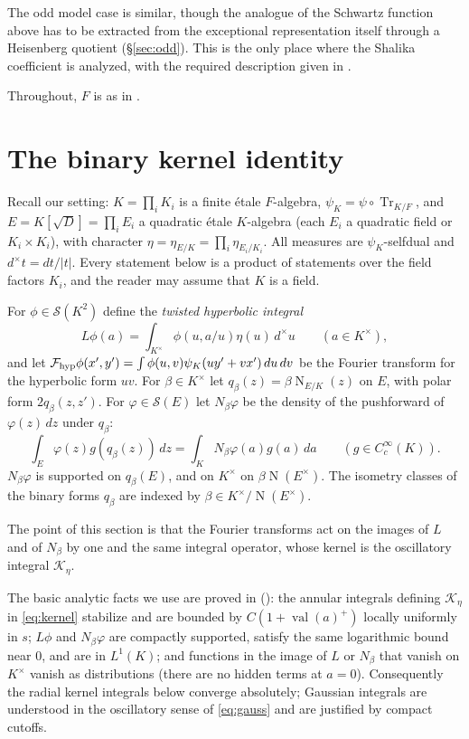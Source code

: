 \documentclass[11pt,oneside,notitlepage]{book}
\numberwithin{equation}{section}
\theoremstyle{plain}
\theoremstyle{definition}
\newcommand{\cS}{\mathcal{S}}
\newcommand{\Tr}{\operatorname{Tr}}
\newcommand{\N}{\operatorname{N}}
\newcommand{\val}{\operatorname{val}}
\begin{document}
 The odd model case is similar, though the analogue of the Schwartz function above has to be extracted from the exceptional representation itself through a Heisenberg quotient (\S\ref{sec:odd}). This is the only place where the Shalika coefficient is analyzed, with the required description given in .

Throughout, $F$ is as in .



\section{The binary kernel identity}\label{sec:binary}

Recall our setting: $K=\prod_iK_i$ is a finite \'etale $F$-algebra, $\psi_K=\psi\circ\Tr_{K/F}$, and $E=K[\sqrt D]=\prod_iE_i$ a quadratic \'etale $K$-algebra (each $E_i$ a quadratic field or $K_i\times K_i$), with character $\eta=\eta_{E/K}=\prod_i\eta_{E_i/K_i}$. All measures are $\psi_K$-selfdual and $d^\times t=dt/|t|$. Every statement below is a product of statements over the field factors $K_i$, and the reader may assume that $K$ is a field.

For $\phi\in\cS(K^2)$ define the \emph{twisted hyperbolic integral}
\[L\phi(a)=\int_{K^\times}\phi(u,a/u)\eta(u)\,d^\times u\qquad(a\in K^\times),\]
and let $\mathcal F_{\rm hyp}\phi(x',y')=\int\phi(u,v)\psi_K(uy'+vx')\,du\,dv$ be the Fourier transform for the hyperbolic form $uv$. For $\beta\in K^\times$ let $q_\beta(z)=\beta\N_{E/K}(z)$ on $E$, with polar form $2q_\beta(z,z')$. For $\varphi\in\cS(E)$ let $N_\beta\varphi$ be the density of the pushforward of $\varphi(z)\,dz$ under $q_\beta$:
\[\int_E\varphi(z)g(q_\beta(z))\,dz=\int_KN_\beta\varphi(a)g(a)\,da\qquad(g\in C_c^\infty(K)).\]
$N_\beta\varphi$ is supported on $q_\beta(E)$, and on $K^\times$ on $\beta\N(E^\times)$. The isometry classes of the binary forms $q_\beta$ are indexed by $\beta\in K^\times/\N(E^\times)$.

The point of this section is that the Fourier transforms act on the images of $L$ and of $N_\beta$ by one and the same integral operator, whose kernel is the oscillatory integral $\mathcal K_\eta$.

The basic analytic facts we use are proved in  (): the annular integrals defining $\mathcal K_\eta$ in \eqref{eq:kernel} stabilize and are bounded by $C(1+\val(a)^+)$ locally uniformly in $s$; $L\phi$ and $N_\beta\varphi$ are compactly supported, satisfy the same logarithmic bound near $0$, and are in $L^1(K)$; and functions in the image of $L$ or $N_\beta$ that vanish on $K^\times$ vanish as distributions (there are no hidden terms at $a=0$). Consequently the radial kernel integrals below converge absolutely; Gaussian integrals are understood in the oscillatory sense of \eqref{eq:gauss} and are justified by compact cutoffs.
\end{document}
